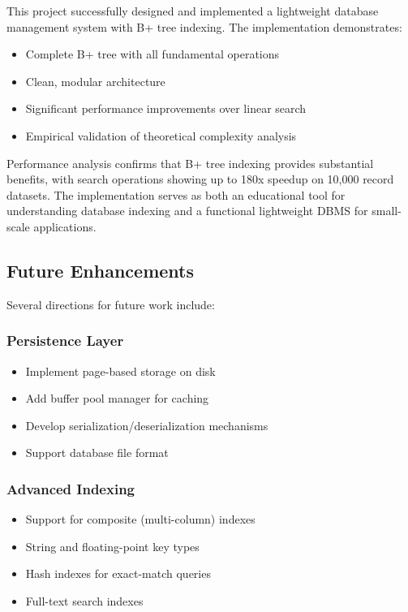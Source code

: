 \documentclass[conference]{IEEEtran}
\begin{document}
This project successfully designed and implemented a lightweight database management system with B+ tree indexing. The implementation demonstrates:

\begin{itemize}
    \item Complete B+ tree with all fundamental operations
    \item Clean, modular architecture
    \item Significant performance improvements over linear search
    \item Empirical validation of theoretical complexity analysis
\end{itemize}

Performance analysis confirms that B+ tree indexing provides substantial benefits, with search operations showing up to 180x speedup on 10,000 record datasets. The implementation serves as both an educational tool for understanding database indexing and a functional lightweight DBMS for small-scale applications.

\subsection{Future Enhancements}

Several directions for future work include:

\subsubsection{Persistence Layer}
\begin{itemize}
    \item Implement page-based storage on disk
    \item Add buffer pool manager for caching
    \item Develop serialization/deserialization mechanisms
    \item Support database file format
\end{itemize}

\subsubsection{Advanced Indexing}
\begin{itemize}
    \item Support for composite (multi-column) indexes
    \item String and floating-point key types
    \item Hash indexes for exact-match queries
    \item Full-text search indexes
\end{itemize}
\end{document}
